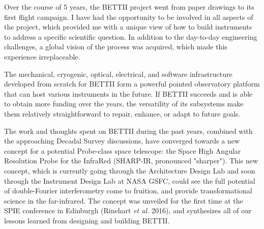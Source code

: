 \vspace{2cm}

Over the course of 5 years, the BETTII project went from paper drawings to its first flight campaign. I have had the opportunity to be involved in all aspects of the project, which provided me with a unique view of how to build instruments to address a specific scientific question. In addition to the day-to-day engineering challenges, a global vision of the process was acquired, which made this experience irreplaceable.


The mechanical, cryogenic, optical, electrical, and software infrastructure developed from scratch for BETTII form a powerful pointed observatory platform that can host various instruments in the future. If BETTII succeeds and is able to obtain more funding over the years, the versatility of its subsystems make them relatively straightforward to repair, enhance, or adapt to future goals. 

The work and thoughts spent on BETTII during the past years, combined with the approaching Decadal Survey discussions, have converged towards a new concept for a potential Probe-class space telescope: the Space High Angular Resolution Probe for the InfraRed (SHARP-IR, pronounced "sharper"). This new concept, which is currently going through the Architecture Design Lab and soon through the Instrument Design Lab at NASA GSFC, could see the full potential of double-Fourier interferometry come to fruition, and provide transformational science in the far-infrared. The concept was unveiled for the first time at the SPIE conference in Edinburgh (Rinehart \textit{et al.} 2016), and synthesizes all of our lessons learned from designing and building BETTII.




